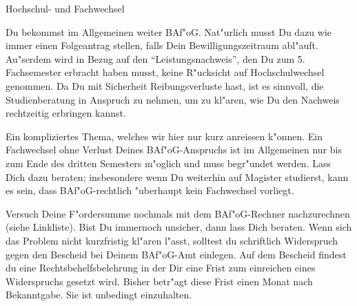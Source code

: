 \begin{artikel}{Hochschul- und Fachwechsel}
\vspace*{-1ex} 

Du bekommst im Allgemeinen weiter BAf"oG. Nat"urlich musst Du dazu wie immer einen Folgeantrag stellen, falls Dein Bewilligungszeitraum abl"auft. Au"serdem wird in Bezug auf den "`Leistungsnachweis"', den Du zum 5. Fachsemester erbracht haben musst, keine R"ucksicht auf Hochschulwechsel genommen. Da Du mit Sicherheit Reibungsverluste hast, ist es sinnvoll, die Studienberatung in Anspruch zu nehmen, um zu kl"aren, wie Du den Nachweis rechtzeitig erbringen kannst. 


Ein kompliziertes Thema, welches wir hier nur kurz anreissen k"onnen. Ein Fachwechsel ohne Verlust Deines BAf"oG-Anspruchs ist im Allgemeinen nur bis zum Ende des dritten Semesters m"oglich und muss begr"undet werden. Lass Dich dazu beraten; insbesondere wenn Du weiterhin auf Magister studierst, kann es sein, dass BAf"oG-rechtlich "uberhaupt kein Fachwechsel vorliegt.

Versuch Deine F"ordersumme nochmals mit dem BAf"oG-Rechner nachzurechnen (siehe Linkliste). Bist Du immernoch unsicher, dann lass Dich beraten. Wenn sich das Problem nicht kurzfristig kl"aren l"asst, solltest du schriftlich Widerspruch gegen den Bescheid bei Deinem BAf"oG-Amt einlegen. Auf dem Bescheid findest du eine Rechtsbehelfsbelehrung in der Dir eine Frist zum einreichen eines Widerspruchs gesetzt wird. Bisher betr"agt diese Frist einen Monat nach Bekanntgabe. Sie ist unbedingt einzuhalten.
\end{artikel}
